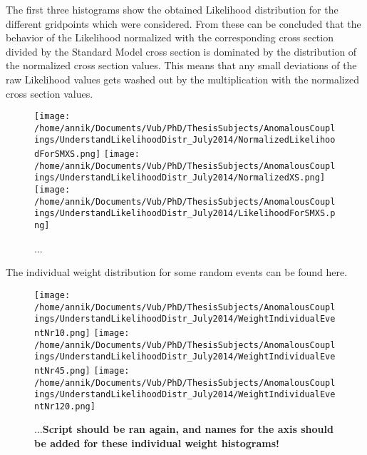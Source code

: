 The first three histograms show the obtained Likelihood distribution for the different gridpoints which were considered. From these can be concluded that the behavior of the Likelihood normalized with the corresponding cross section divided by the Standard Model cross section is dominated by the distribution of the normalized cross section values. This means that any small deviations of the raw Likelihood values gets washed out by the multiplication with the normalized cross section values.
\begin{figure}[!h]
\texttt{[image: /home/annik/Documents/Vub/PhD/ThesisSubjects/AnomalousCouplings/UnderstandLikelihoodDistr\_July2014/NormalizedLikelihoodForSMXS.png]}
\texttt{[image: /home/annik/Documents/Vub/PhD/ThesisSubjects/AnomalousCouplings/UnderstandLikelihoodDistr\_July2014/NormalizedXS.png]}
\texttt{[image: /home/annik/Documents/Vub/PhD/ThesisSubjects/AnomalousCouplings/UnderstandLikelihoodDistr\_July2014/LikelihoodForSMXS.png]}
\caption{...}
\end{figure}

The individual weight distribution for some random events can be found here.
\begin{figure}[!h]
\texttt{[image: /home/annik/Documents/Vub/PhD/ThesisSubjects/AnomalousCouplings/UnderstandLikelihoodDistr\_July2014/WeightIndividualEventNr10.png]}
\texttt{[image: /home/annik/Documents/Vub/PhD/ThesisSubjects/AnomalousCouplings/UnderstandLikelihoodDistr\_July2014/WeightIndividualEventNr45.png]}
\texttt{[image: /home/annik/Documents/Vub/PhD/ThesisSubjects/AnomalousCouplings/UnderstandLikelihoodDistr\_July2014/WeightIndividualEventNr120.png]}
\caption{...\textbf{Script should be ran again, and names for the axis should be added for these individual weight histograms!}}
\end{figure}

